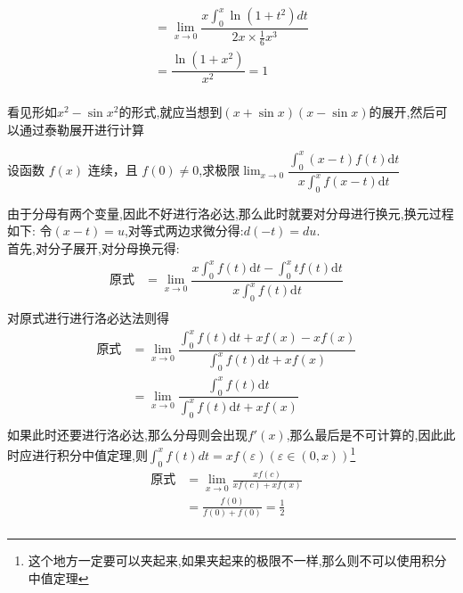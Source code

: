 \documentclass[10pt, a4paper, oneside, UTF8]{ctexbook}
\begin{document}
\begin{sloppypar}
\begin{solution}
\begin{align*}
            & =  \lim_{x\to0}\dfrac{x\int_0^x\ln{(1+t^2)}dt}{2x \times \frac{1}{6}x^3} & \\
            & = \dfrac{\ln(1+x^2)}{x^2}=1  & \\
        \end{align*}
    \end{solution}
    \begin{note}
        看见形如$x^2-\sin x^2$的形式,就应当想到$(x+\sin x)(x-\sin x)$的展开,然后可以通过泰勒展开进行计算
    \end{note}
    \begin{problem}
        设函数 $f(x)$ 连续，且 $f(0)\neq0$,求极限$\operatorname*{lim}_{x\to0}{\dfrac{\int_{0}^{x}\left(x-t\right)f\left(t\right)\mathrm{d}t}{x\int_{0}^{x}f\left(x-t\right)\mathrm{d}t}}$
    \end{problem}
    \begin{solution}
        由于分母有两个变量,因此不好进行洛必达,那么此时就要对分母进行换元,换元过程如下:
        令$(x-t)=u$,对等式两边求微分得:$d(-t)=du$.\\
        首先,对分子展开,对分母换元得:
        \begin{align*}
            \text{原式} & = \lim_{x\to0}\dfrac{x\int_{0}^{x}f(t)\mathrm{d}t-\int_{0}^{x}tf\left(t\right)\mathrm{d}t}{x\int_{0}^{x}f(t)\mathrm{d}t}  & \\ 
        \end{align*}
        对原式进行进行洛必达法则得
        \begin{align*}
            \text{原式} & = \lim_{x\to0}\dfrac{\int_0^xf(t)\mathrm{d}t+xf(x)-xf(x)}{\int_0^xf(t)\mathrm{d}t+xf(x)} & \\
            & =  \lim\limits_{x\to0}\dfrac{\int_0^xf(t)\mathrm{d}t}{\int_0^xf(t)\mathrm{d}t+xf(x)} & \\  
        \end{align*}
        如果此时还要进行洛必达,那么分母则会出现$f'(x)$,那么最后是不可计算的,因此此时应进行积分中值定理,则$\int _0 ^x f(t)dt=xf(\varepsilon) (\varepsilon \in (0,x))$\footnote{这个地方一定要可以夹起来,如果夹起来的极限不一样,那么则不可以使用积分中值定理}
        \begin{align*}
            \text{原式} & = \lim_{x\to0}\frac{xf\left(c\right)}{xf\left(c\right)+xf\left(x\right)} & \\
            & = \frac{f(0)}{f(0)+f(0)}=\frac12 &\\ 
        \end{align*}
    \end{solution}
    \begin{note}

\end{note}
\end{sloppypar}
\end{document}
